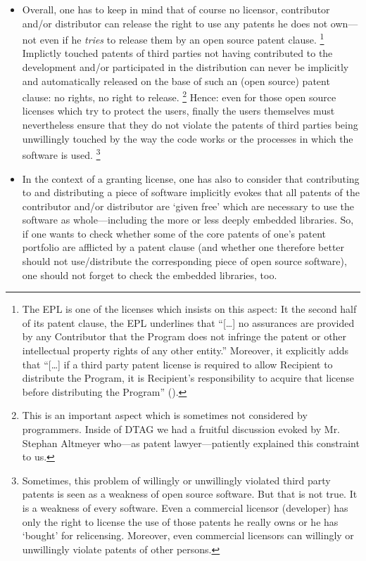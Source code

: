 \begin{itemize}
  
  \item Overall, one has to keep in mind that of course no licensor, contributor
  and/or distributor can release the right to use any patents he does not own---%
  not even if he \emph{tries} to release them by an open source patent
  clause.%
    \footnote{The EPL is one of the licenses which insists on this aspect:
    It the second half of its patent clause, the EPL underlines that
    \enquote{[\ldots] no assurances are provided by any Contributor that the
    Program does not infringe the patent or other intellectual property rights of
    any other entity.} Moreover, it explicitly adds that \enquote{[\ldots] if a
    third party patent license is required to allow Recipient to distribute the
    Program, it is Recipient's responsibility to acquire that license before
    distributing the Program} (\cite[cf.][\nopage wp §2c]{Epl10OsiLicense2005a}).}
  Implictly touched patents of third parties not having contributed to the
  development and/or participated in the distribution can never be implicitly
  and automatically released on the base of such an (open source) patent clause:
  no rights, no right to release.%
    \footnote{This is an important aspect which is sometimes not considered by
    programmers. Inside of DTAG we had a fruitful discussion evoked by Mr. Stephan
    Altmeyer who---as patent lawyer---patiently explained this constraint to us.} 
  Hence: even for those open source licenses which try to protect the users,
  finally the users themselves must nevertheless ensure that they do not violate
  the patents of third parties being unwillingly touched by the way the code
  works or the processes in which the software is used.%
    \footnote{Sometimes, this problem of willingly or
    unwillingly violated third party patents is seen as a weakness of open source
    software. But that is not true. It is a weakness of every software. Even a
    commercial licensor (developer) has only the right to license the use of those
    patents he really owns or he has `bought' for relicensing. Moreover, even
    commercial licensors can willingly or unwillingly violate patents of other
    persons.}
  
  \item In the context of a granting license, one has also to consider that
  contributing to and distributing a piece of software implicitly evokes that
  all patents of the contributor and/or distributor are `given free' which are
  necessary to use the software as whole---including the more or less deeply
  embedded libraries. So, if one wants to check whether some of the core patents
  of one's patent portfolio are afflicted by a patent clause (and whether one
  therefore better should not use/distribute the corresponding piece of open
  source software), one should not forget to check the embedded libraries, too.
  

\end{itemize}
